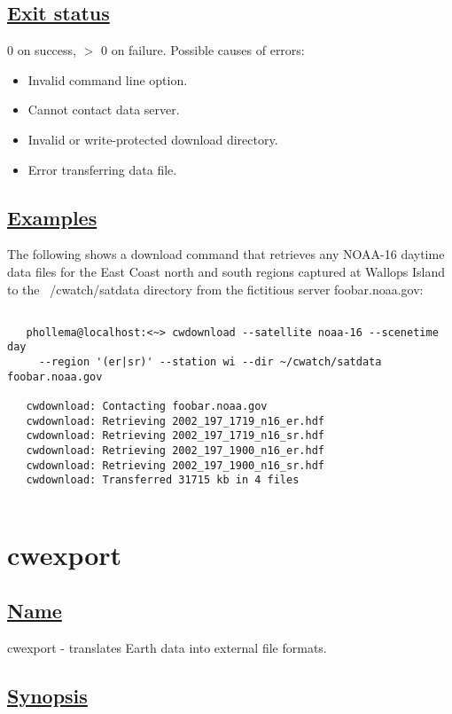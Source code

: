 \subsection*{\underline{Exit status}}


  0 on success, $>$ 0 on failure. Possible causes of errors: \begin{itemize}
\item  Invalid command line option. 
\item  Cannot contact data server. 
\item  Invalid or write-protected download directory. 
\item  Error transferring data file. 

\end{itemize}

\subsection*{\underline{Examples}}


  The following shows a download command that retrieves any NOAA-16 daytime data files for the East Coast north and south regions captured at Wallops Island to the ~/cwatch/satdata directory from the fictitious server foobar.noaa.gov: \begin{verbatim}

   phollema@localhost:<~> cwdownload --satellite noaa-16 --scenetime day 
     --region '(er|sr)' --station wi --dir ~/cwatch/satdata foobar.noaa.gov

   cwdownload: Contacting foobar.noaa.gov
   cwdownload: Retrieving 2002_197_1719_n16_er.hdf
   cwdownload: Retrieving 2002_197_1719_n16_sr.hdf
   cwdownload: Retrieving 2002_197_1900_n16_er.hdf
   cwdownload: Retrieving 2002_197_1900_n16_sr.hdf
   cwdownload: Transferred 31715 kb in 4 files
 
\end{verbatim}


\newpage
\section{cwexport} \hypertarget{cwexport}{}
\subsection*{\underline{Name}}


   cwexport - translates Earth data into external file formats.  
\subsection*{\underline{Synopsis}}


